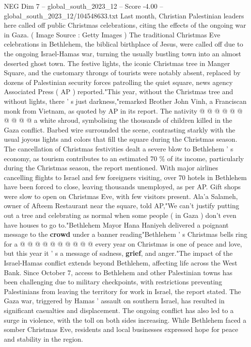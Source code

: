\begin{textsample}{NEG Dim 7 – global\_south\_2023\_12 – Score -4.00 – global\_south\_2023\_12/104548633.txt}
Last month, Christian Palestinian leaders here called off public Christmas celebrations, citing the effects of the ongoing war in Gaza. ( Image Source : Getty Images ) The traditional Christmas Eve celebrations in Bethlehem, the biblical birthplace of Jesus, were called off due to the ongoing Israel-Hamas war, turning the usually bustling town into an almost deserted ghost town.
The festive lights, the iconic Christmas tree in Manger Square, and the customary throngs of tourists were notably absent, replaced by dozens of Palestinian security forces patrolling the quiet square, news agency Associated Press ( AP ) reported."This year, without the Christmas tree and without lights, there ' s just darkness,"remarked Brother John Vinh, a Franciscan monk from Vietnam, as quoted by AP in its report.
The nativity @ @ @ @ @ @ @ @ @ @ a white shroud, symbolising the thousands of children killed in the Gaza conflict.
Barbed wire surrounded the scene, contrasting starkly with the usual joyous lights and colors that fill the square during the Christmas season.
The cancellation of Christmas festivities dealt a severe blow to Bethlehem ' s economy, as tourism contributes to an estimated 70 \% of its income, particularly during the Christmas season, the report mentioned.
With major airlines cancelling flights to Israel and few foreigners visiting, over 70 hotels in Bethlehem have been forced to close, leaving thousands unemployed, as per AP.
Gift shops were slow to open on Christmas Eve, with few visitors present.
Ala'a Salameh, owner of Afteem Restaurant near the square, told AP,"We can't justify putting out a tree and celebrating as normal when some people ( in Gaza ) don't even have houses to go to."Bethlehem Mayor Hana Haniyeh delivered a poignant message to the \textbf{crowd} under a banner reading"Bethlehem ' s Christmas bells ring for a @ @ @ @ @ @ @ @ @ @ every year on Christmas is one of peace and love, but this year it ' s a message of sadness, \textbf{grief}, and anger."The impact of the Israel-Hamas conflict extends beyond Bethlehem, affecting life across the West Bank.
Since October 7, access to Bethlehem and other Palestinian towns has been challenging due to military checkpoints, with restrictions preventing Palestinians from leaving the territory for work in Israel, the report stated.
The Gaza war, triggered by Hamas ' assault on southern Israel, has resulted in significant casualties and displacement.
The ongoing conflict has also led to a surge in violence, with the toll on both sides increasing.
While Bethlehem faced a somber Christmas Eve, residents and local businesses expressed hope for peace and stability in the region.

\end{textsample}
